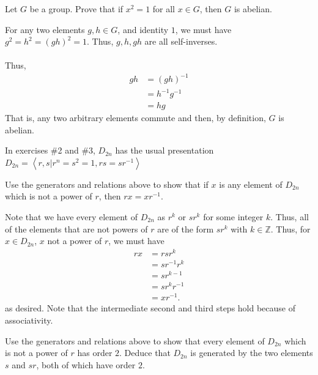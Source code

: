 \documentclass[12 pt, letterpaper]{hmcpset}
\begin{document}
\begin{problem}
	Let $G$ be a group. Prove that if $x^2 = 1$ for all $x \in G$, then $G$ is abelian.
\end{problem}

\begin{solution}
	For any two elements $g, h \in G$, and identity $1$, we must have $g^2 = h^2 = (gh)^2 = 1$. Thus, $g, h, gh$ are all self-inverses. \\\\
	Thus,
	\[
		\begin{split}
			g h & = (g h)^{-1} \\
			    & = h^{-1} g^{-1} \\
			    & = h g
		\end{split}
	\]
	That is, any two arbitrary elements commute and then, by definition, $G$ is abelian.
\end{solution}

\pagebreak

In exercises \#2 and \#3, $D_{2n}$ has the usual presentation $D_{2n} = \left < r, s \vert r^n = s^2 = 1, rs = sr^{-1} \right >$

\begin{problem}
	Use the generators and relations above to show that if $x$ is any element of $D_{2n}$ which is not a power of $r$, then $rx = xr^{-1}$.
\end{problem}

\begin{solution}
	Note that we have every element of $D_{2n}$ as $r^k$ or $s r^k$ for some integer $k$. Thus, all of the elements that are not powers of $r$ are of the form $s r^k$ with $k \in \mathbb Z$. Thus, for $x \in D_{2n}$, $x$ not a power of $r$, we must have
	\[
		\begin{split}
			r x & = r s r^k \\
			    & = s r^{-1} r^k \\
			    & = s r^{k - 1} \\
			    & = s r^k r^{-1} \\
			    & = x r^{-1}.
		\end{split}
	\]
	as desired. Note that the intermediate second and third steps hold because of associativity.
\end{solution}

\pagebreak

\begin{problem}
	Use the generators and relations above to show that every element of $D_{2n}$ which is not a power of $r$ has order $2$. Deduce that $D_{2n}$ is generated by the two elements $s$ and $sr$, both of which have order $2$.
\end{problem}
\end{document}
